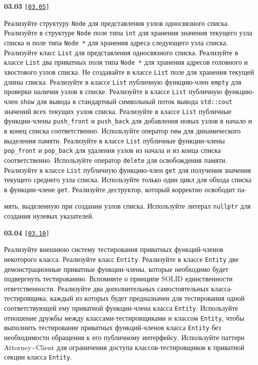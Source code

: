 \documentclass[a4paper,12pt]{article}
\begin{document}
\bigskip

{\large \textbf{03.03} \texttt{[\href{https://github.com/i-s-m-mipt/Education/blob/master/projects/examples/source/03.05.cpp}{\texttt{03.05}}]}}

\bigskip

Реализуйте структуру \lstinline{Node} для представления узлов односвязного списка. Реализуйте в структуре \lstinline{Node} поле типа \lstinline{int} для хранения значения текущего узла списка и поле типа \lstinline{Node *} для хранения адреса следующего узла списка. Реализуйте класс \lstinline{List} для представления односвязного списка. Реализуйте в классе \lstinline{List} два приватных поля типа \lstinline{Node *} для хранения адресов головного и хвостового узлов списка. Не создавайте в классе \lstinline{List} поле для хранения текущей длины списка. Реализуйте в классе \lstinline{List} публичную функцию-член \lstinline{empty} для проверки наличия узлов в списке. Реализуйте в классе \lstinline{List} публичную функцию-член \lstinline{show} для вывода в стандартный символьный поток вывода \lstinline{std::cout} значений всех текущих узлов списка. Реализуйте в классе \lstinline{List} публичные функции-члены \lstinline{push_front} и \lstinline{push_back} для добавления новых узлов в начало и в конец списка соответственно. Используйте оператор \lstinline{new} для динамического выделения памяти. Реализуйте в классе \lstinline{List} публичные функции-члены \lstinline{pop_front} и \lstinline{pop_back} для удаления узлов из начала и из конца списка соответственно. Используйте оператор \lstinline{delete} для освобождения памяти. Реализуйте в классе \lstinline{List} публичную функцию-член \lstinline{get} для получения значения текущего среднего узла списка. Используйте только один цикл для обхода списка в функции-члене \lstinline{get}. Реализуйте деструктор, который корректно освободит па- 

мять, выделенную при создании узлов списка. Используйте литерал \lstinline{nullptr} для создания нулевых указателей.

\bigskip

{\large \textbf{03.04} \texttt{[\href{https://github.com/i-s-m-mipt/Education/blob/master/projects/examples/source/03.10.cpp}{\texttt{03.10}}]}}

\bigskip

Реализуйте внешнюю систему тестирования приватных функций-членов некоторого класса. Реализуйте класс \lstinline{Entity}. Реализуйте в классе \lstinline{Entity} две демонстрационные приватные функции-члены, которые необходимо будет подвергнуть тестированию. Вспомните о принципе SOLID единственности ответственности. Реализуйте два дополнительных самостоятельных класса-тестировщика, каждый из которых будет предназначен для тестирования одной соответствующей ему приватной функции-члена класса \lstinline{Entity}. Используйте отношение дружбы между классами-тестировщиками и классом \lstinline{Entity}, чтобы выполнить тестирование приватных функций-членов класса \lstinline{Entity} без необходимости обращения к его публичному интерфейсу. Используйте паттерн Attorney\,-\,Client для ограничения доступа классов-тестировщиков к приватной секции класса \lstinline{Entity}.
\end{document}
